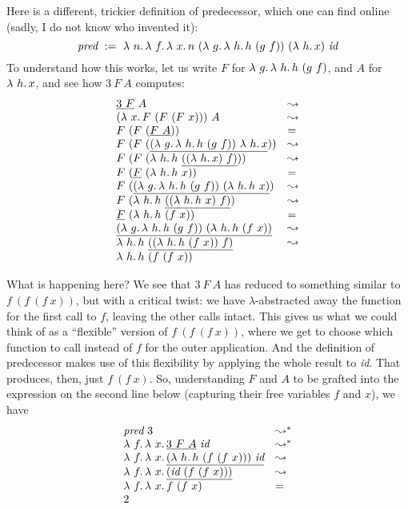   Here is a different, trickier definition of predecessor, which one can find online (sadly, I do
not know who invented it):
\[
\textit{pred}\ :=\ \lam{n}{\lam{f}{\lam{x}{n\ (\lam{g}{\lam{h}{h\ (g\ f)}})\ (\lam{h}{x})\ \textit{id}}}}
\]
\noindent To understand how this works, let us write $F$ for $\lambda\ g.\, \lambda\ h.\, h\ (g\ f)$, and $A$ for $\lambda\ h.\, x$, and
see how $3\ F\ A$ computes:
\[
\begin{array}{ll}
  \underline{3\ F}\ A & \leadsto \\
  (\lambda\ x.\, F\ (F\ (F\ x)))\ A & \leadsto \\
  F\ (F\ (\underline{F\ A})) & = \\
  F\ (F\ (\underline{(\lambda\ g.\, \lambda\ h.\, h\ (g\ f))\ \lambda\ h.\, x})) & \leadsto \\  
  F\ (F\ (\lambda\ h.\, h\ \underline{((\lambda\ h.\, x)\ f)})) & \leadsto \\
  F\ (\underline{F}\ (\lambda\ h.\, h\ x)) & = \\
  F\ (\underline{(\lambda\ g.\, \lambda\ h.\, h\ (g\ f))\ (\lambda\ h.\, h\ x)}) & \leadsto \\      
  F\ (\lambda\ h.\, h\ \underline{((\lambda\ h.\, h\ x)\ f)}) & \leadsto \\
  \underline{F}\ (\lambda\ h.\, h\ (f\ x)) & = \\
  \underline{(\lambda\ g.\, \lambda\ h.\, h\ (g\ f))\ (\lambda\ h.\, h\ (f\ x))} & \leadsto \\
  \lambda\ h.\, h\ \underline{((\lambda\ h.\, h\ (f\ x))\ f)} & \leadsto \\
  \lambda\ h.\, h\ (f\ (f\ x)) & \
\end{array}
\]

What is happening here?  We see that $3\ F\ A$ has reduced to something similar to $f\ (f\ (f\ x))$, but
with a critical twist: we have $\lambda$-abstracted away the function for the first call to $f$, leaving
the other calls intact.  This gives us what we could think of as a ``flexible'' version of $f\ (f\ (f\ x))$, where we get
to choose which function to call instead of $f$ for the outer application.  And the definition of predecessor makes use of this flexibility
by applying the whole result to \textit{id}.  That produces, then, just $f\ (f\ x)$.  So, understanding $F$ and $A$ to be grafted
into the expression on the second line below (capturing their free variables $f$ and $x$), we have
\[
\begin{array}{ll}
  \textit{pred}\ 3 & \leadsto^* \\
  \lam{f}{\lam{x}{\underline{3\ F\ A}\ \textit{id}}} & \leadsto^* \\
  \lam{f}{\lam{x}{\underline{(\lam{h}{h\ (f\ (f\ x))})\ \textit{id}}}} & \leadsto \\
  \lam{f}{\lam{x}{\underline{(\textit{id}\ (f\ (f\ x)))}}} & \leadsto \\
  \lam{f}{\lam{x}{f\ (f\ x)}} & = \\  
  2 &\ 
\end{array}
\]

